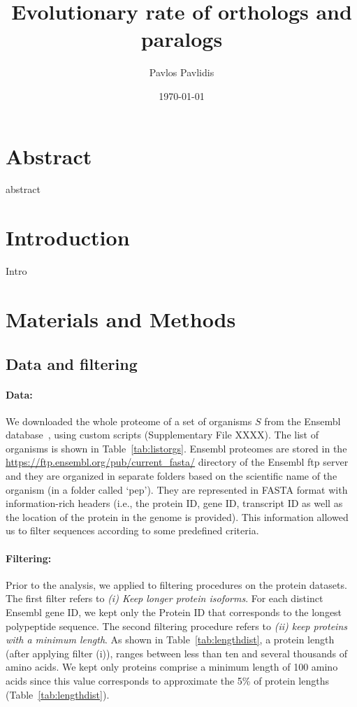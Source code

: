 \documentclass[12pt]{article}
\title{Evolutionary rate of orthologs and paralogs}
\date{\today}
\author{Pavlos Pavlidis}
\begin{document}
\maketitle

\section*{Abstract}
abstract

\section*{Introduction}
Intro

\section*{Materials and Methods}
\subsection*{Data and filtering}
\paragraph{Data:} We downloaded the whole proteome of a set of organisms $S$ from the
Ensembl database~\citep{cunningham2022ensembl}, using custom scripts (Supplementary File XXXX). The
list of organisms is shown in Table~\ref{tab:listorgs}. Ensembl
proteomes are stored in the
\url{https://ftp.ensembl.org/pub/current_fasta/} directory of the
Ensembl ftp server and they are organized in separate folders based on
the scientific name of the organism (in a folder called `pep'). They
are represented in FASTA format with information-rich 
headers (i.e., the protein ID, gene ID, transcript ID as well as the
location of the protein in the genome is provided). This information
allowed us to filter sequences according to some predefined
criteria.

\paragraph{Filtering:} Prior to the analysis, we applied to filtering
procedures on the protein datasets. The first filter refers to
\emph{(i) Keep longer protein isoforms}. For 
each distinct Ensembl gene ID, we kept only the Protein ID that
corresponds to the longest polypeptide sequence. The second filtering
procedure refers to
\emph{(ii) keep proteins with a minimum length}. As shown in
Table~\ref{tab:lengthdist}, a protein length (after applying filter
(i)), ranges between less than ten and several thousands of amino acids. We
kept only proteins comprise a minimum length of 100 amino acids
since this value corresponds to approximate the 5\% of protein
lengths (Table~\ref{tab:lengthdist}).
\end{document}
